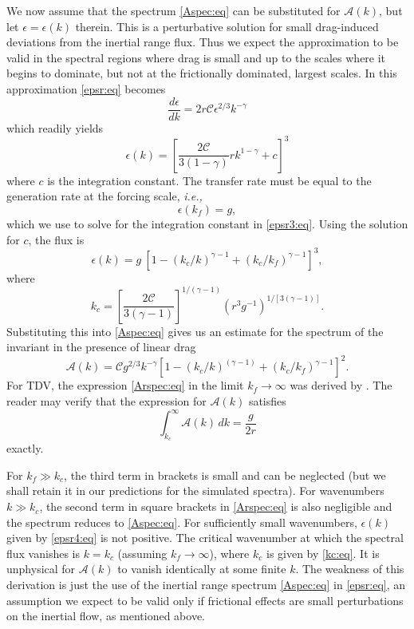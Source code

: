 \documentclass{jfm}
\newcommand{\ie}  {\textit{i.e., }}
\newcommand{\ca}  [1]{\mathcal{#1}}
\newcommand{\dd}  [2]{\frac{d #1}{d #2}}
\begin{document}
We now assume that the spectrum \eqref{Aspec:eq} can be substituted
for $\ca{A}(k)$, but let $\epsilon = \epsilon(k)$ therein. This is a
perturbative solution for small drag-induced deviations from the
inertial range flux.  Thus we expect the approximation to be valid in
the spectral regions where drag is small and up to the scales where it
begins to dominate, but not at the frictionally dominated, largest
scales.  In this approximation \eqref{epsr:eq} becomes
\begin{equation}
\dd{\epsilon}{k} = 2r\ca{C}\epsilon^{2/3}k^{-\gamma}
\label{epsr2:eq}
\end{equation}
which readily yields
\begin{equation}
\epsilon(k) = \left[\frac{2\ca{C}}{3(1-\gamma)}rk^{1-\gamma} +
c\right]^3
\label{epsr3:eq}
\end{equation}
where $c$ is the integration constant.  The transfer rate must be
equal to the generation rate at the forcing scale, \ie
\begin{equation}
\epsilon(k_f) = g,
\label{bc:eq}
\end{equation}
which we use to solve for the integration constant in
\eqref{epsr3:eq}.  Using the solution for $c$, the flux is
\begin{equation}
\epsilon(k) =
g~\left[1 - (k_c/k)^{\gamma-1} + (k_c/k_f)^{\gamma-1} \right]^3,
\label{epsr4:eq}
\end{equation}
where
\begin{equation}
k_c =\left[\frac{2\ca{C}}{3(\gamma-1)}\right]^{1/(\gamma-1)}
\left(r^3g^{-1}\right)^{1/[3(\gamma-1)]}.
\label{kc:eq}
\end{equation}
Substituting this into \eqref{Aspec:eq} gives us an estimate for the
spectrum of the invariant in the presence of linear drag
\begin{equation}
\ca{A}(k) = \ca{C}g^{2/3}k^{-\gamma}
\left[1 - (k_c/k)^{(\gamma-1)} + (k_c/k_f)^{\gamma-1}\right]^2.
\label{Arspec:eq}
\end{equation}
For TDV, the expression \eqref{Arspec:eq} in the limit $k_f
\rightarrow \infty$ was derived by \citet{Lilly72}.  The reader
may verify that the expression for $\ca{A}(k)$ satisfies
\begin{equation}
\int_{k_c}^{\infty}\ca{A}(k)\, dk = \frac{g}{2r}
\label{Aint:eq}
\end{equation}
exactly.

For $k_f\gg k_c$, the third term in brackets is small and can be
neglected (but we shall retain it in our predictions for the simulated
spectra).  For wavenumbers $k\gg k_c$, the second term in square
brackets in \eqref{Arspec:eq} is also negligible and the spectrum
reduces to \eqref{Aspec:eq}. For sufficiently small wavenumbers,
$\epsilon(k)$ given by \eqref{epsr4:eq} is not positive. The critical
wavenumber at which the spectral flux vanishes is $k=k_c$ (assuming
$k_f\rightarrow\infty$), where $k_c$ is given by \eqref{kc:eq}. It is
unphysical for $\ca{A}(k)$ to vanish identically at some finite
$k$. The weakness of this derivation is just the use of the inertial
range spectrum \eqref{Aspec:eq} in \eqref{epsr:eq}, an assumption we
expect to be valid only if frictional effects are small perturbations
on the inertial flow, as mentioned above.
\end{document}
